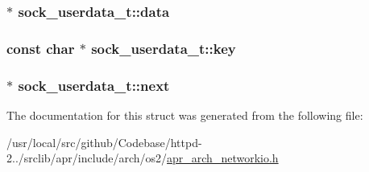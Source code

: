\subsubsection[{\texorpdfstring{data}{data}}]{ $\ast$ sock\+\_\+userdata\+\_\+t\+::data}\hypertarget{structsock__userdata__t_a8f2e13b1566dc2edc2747284afa0736b}{}\label{structsock__userdata__t_a8f2e13b1566dc2edc2747284afa0736b}
\subsubsection[{\texorpdfstring{key}{key}}]{\setlength{\rightskip}{0pt plus 5cm}const char $\ast$ sock\+\_\+userdata\+\_\+t\+::key}\hypertarget{structsock__userdata__t_a269c5c5398407ad21bc9650d46d12828}{}\label{structsock__userdata__t_a269c5c5398407ad21bc9650d46d12828}
\subsubsection[{\texorpdfstring{next}{next}}]{ $\ast$ sock\+\_\+userdata\+\_\+t\+::next}\hypertarget{structsock__userdata__t_a7d67d5d0a6470fe1ad6f39f6810c27d5}{}\label{structsock__userdata__t_a7d67d5d0a6470fe1ad6f39f6810c27d5}


The documentation for this struct was generated from the following file\+:\begin{DoxyCompactItemize}
\item 
/usr/local/src/github/\+Codebase/httpd-\/2../srclib/apr/include/arch/os2/\hyperlink{os2_2apr__arch__networkio_8h}{apr\+\_\+arch\+\_\+networkio.\+h}\end{DoxyCompactItemize}
